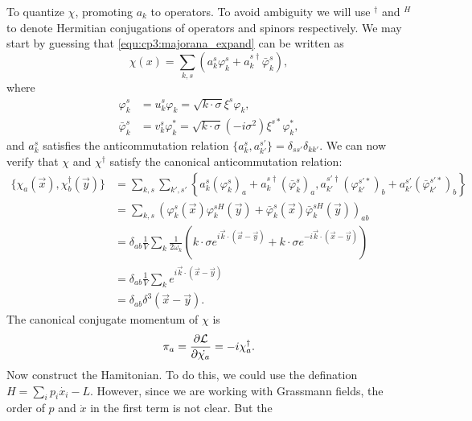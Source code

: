 \begin{problembody}
\begin{subequations}
    \end{subequations}
    To quantize $\chi$, promoting $a_k$ to operators. To avoid ambiguity we will use ${}^\dagger$ and ${}^H$ to denote Hermitian conjugations of
    operators and spinors respectively. We may start by guessing that \eqref{equ:cp3:majorana_expand} can be written as
    \begin{equation}\label{equ:cp3:majorana_expand_q}
        \chi(x) = \sum_{k, s} \left(a_k^s \varphi_k^s + a_k^{s\dagger} \bar{\varphi}_k^s\right),
    \end{equation}
    where
    \begin{subequations}
        \begin{align}
            \varphi_k^s & = u_k^s \varphi_k = \sqrt{k\cdot\sigma}\xi^s \varphi_k,\\
            \bar{\varphi}_k^s & = v_k^s \varphi_k^\ast = \sqrt{k\cdot\sigma} (-i\sigma^2) \xi^{s\ast} \varphi_k^\ast,
        \end{align}
    \end{subequations}
    and $a_k^s$ satisfies the anticommutation relation $\{a_k^s, a_{k'}^{s'}\} = \delta_{ss'}\delta_{kk'}$. We can now verify that $\chi$ and $\chi^\dagger$ satisfy the canonical anticommutation relation: 
    \begin{align*}
        \{\chi_a(\vec{x}), \chi_b^\dagger(\vec{y})\} & = \sum_{k, s}\sum_{k', s'}\left\{a_k^s(\varphi_k^s)_a + a_k^{s\dagger}(\bar{\varphi}_k^s)_a, a_{k'}^{s'\dagger}(\varphi_{k'}^{s'\ast})_b + a_{k'}^{s'}(\bar{\varphi}_{k'}^{s'\ast})_b\right\}\\
        & = \sum_{k, s}\left(\varphi_k^s(\vec{x})\varphi_k^{sH}(\vec{y}) + \bar{\varphi}_k^s(\vec{x})\bar{\varphi}_k^{sH}(\vec{y})\right)_{ab}\\
        & = \delta_{ab} \frac{1}{V}\sum_k\frac{1}{2\omega_k}\left(k\cdot\sigma e^{i\vec{k}\cdot(\vec{x} - \vec{y})} + k\cdot\sigma e^{-i\vec{k}\cdot(\vec{x} - \vec{y})}\right)\\
        & = \delta_{ab} \frac{1}{V}\sum_k e^{i\vec{k}\cdot(\vec{x} - \vec{y})}\\
        & = \delta_{ab}\delta^3(\vec{x} - \vec{y}).
    \end{align*}
    The canonical conjugate momentum of $\chi$ is
    \begin{equation*}
        \pi_a = \frac{\partial \mathcal{L}}{\partial \dot{\chi_a}} = -i\chi_a^\dagger.
    \end{equation*}
    Now construct the Hamitonian. To do this, we could use the defination $H = \sum_i p_i\dot{x_i} - L$. However, since we are working with Grassmann fields, the order of $p$ and $\dot{x}$ in the first term is not clear. But the

\end{problembody}
